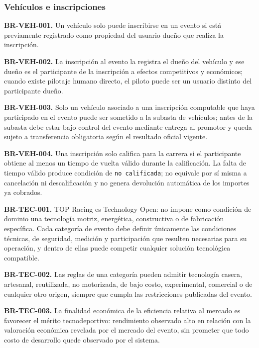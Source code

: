 \documentclass[10pt,letterpaper]{article}
\begin{document}
\subsubsection{Vehículos e inscripciones}
\noindent\textbf{BR-VEH-001.} Un vehículo solo puede inscribirse en un evento si está previamente registrado como propiedad del usuario dueño que realiza la inscripción.\par
\noindent\textbf{BR-VEH-002.} La inscripción al evento la registra el dueño del vehículo y ese dueño es el participante de la inscripción a efectos competitivos y económicos; cuando existe pilotaje humano directo, el piloto puede ser un usuario distinto del participante dueño.\par
\noindent\textbf{BR-VEH-003.} Solo un vehículo asociado a una inscripción computable que haya participado en el evento puede ser sometido a la subasta de vehículos; antes de la subasta debe estar bajo control del evento mediante entrega al promotor y queda sujeto a transferencia obligatoria según el resultado oficial vigente.\par
\noindent\textbf{BR-VEH-004.} Una inscripción solo califica para la carrera si el participante obtiene al menos un tiempo de vuelta válido durante la calificación. La falta de tiempo válido produce condición de \texttt{no calificada}; no equivale por sí misma a cancelación ni descalificación y no genera devolución automática de los importes ya cobrados.\par
\noindent\textbf{BR-TEC-001.} TOP Racing es Technology Open: no impone como condición de dominio una tecnología motriz, energética, constructiva o de fabricación específica. Cada categoría de evento debe definir únicamente las condiciones técnicas, de seguridad, medición y participación que resulten necesarias para su operación, y dentro de ellas puede competir cualquier solución tecnológica compatible.\par
\noindent\textbf{BR-TEC-002.} Las reglas de una categoría pueden admitir tecnología casera, artesanal, reutilizada, no motorizada, de bajo costo, experimental, comercial o de cualquier otro origen, siempre que cumpla las restricciones publicadas del evento.\par
\noindent\textbf{BR-TEC-003.} La finalidad económica de la eficiencia relativa al mercado es favorecer el mérito tecnodeportivo: rendimiento observado alto en relación con la valoración económica revelada por el mercado del evento, sin prometer que todo costo de desarrollo quede observado por el sistema.\par
\end{document}
